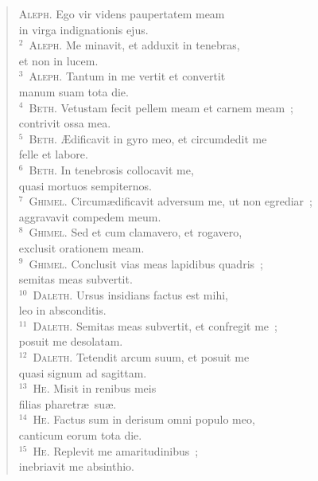 \begin{flushleft}\begin{verse}\vspace{-19pt}\textsc{Aleph.} Ego vir videns paupertatem meam\\ in virga indignationis ejus.\\
${}^{2}$~\textsc{Aleph.} Me minavit, et adduxit in tenebras,\\ et non in lucem.\\
${}^{3}$~\textsc{Aleph.} Tantum in me vertit et convertit\\ manum suam tota die.\\
${}^{4}$~\textsc{Beth.} Vetustam fecit pellem meam et carnem meam~;\\ contrivit ossa mea.\\
${}^{5}$~\textsc{Beth.} \AE dificavit in gyro meo, et circumdedit me\\ felle et labore.\\
${}^{6}$~\textsc{Beth.} In tenebrosis collocavit me,\\ quasi mortuos sempiternos.\\
${}^{7}$~\textsc{Ghimel.} Circum\ae dificavit adversum me, ut non egrediar~;\\ aggravavit compedem meum.\\
${}^{8}$~\textsc{Ghimel.} Sed et cum clamavero, et rogavero,\\ exclusit orationem meam.\\
${}^{9}$~\textsc{Ghimel.} Conclusit vias meas lapidibus quadris~;\\ semitas meas subvertit.\\
${}^{10}$~\textsc{Daleth.} Ursus insidians factus est mihi,\\ leo in absconditis.\\
${}^{11}$~\textsc{Daleth.} Semitas meas subvertit, et confregit me~;\\ posuit me desolatam.\\
${}^{12}$~\textsc{Daleth.} Tetendit arcum suum, et posuit me\\ quasi signum ad sagittam.\\
${}^{13}$~\textsc{He.} Misit in renibus meis\\ filias pharetr\ae\ su\ae .\\
${}^{14}$~\textsc{He.} Factus sum in derisum omni populo meo,\\ canticum eorum tota die.\\
${}^{15}$~\textsc{He.} Replevit me amaritudinibus~;\\ inebriavit me absinthio.\\

\end{verse}
\end{flushleft}
